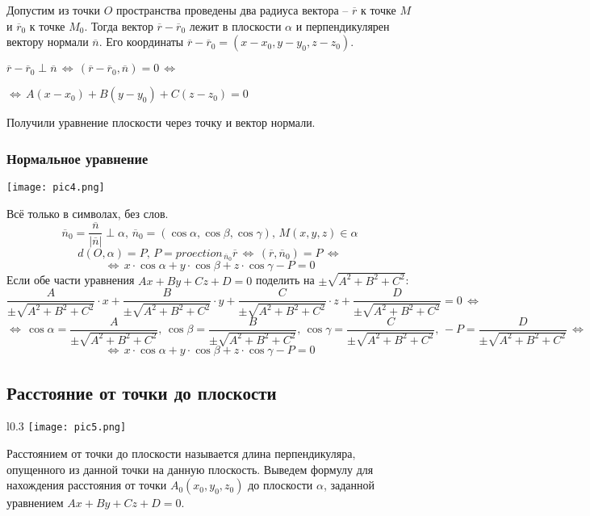 \documentclass{article}
\begin{document}
Допустим из точки $O$ пространства проведены два радиуса вектора -- $\overline{r}$ к точке $M$ и $\overline{r}_0$ к точке $M_0$. Тогда вектор $\overline{r}-\overline{r}_0$ лежит в плоскости $\alpha$ и перпендикулярен вектору нормали $\overline{n}$. Его координаты $\overline{r}-\overline{r}_0=(x-x_0,y-y_0,z-z_0)$.

$\overline{r}-\overline{r}_0\perp \overline{n}\,\Leftrightarrow\,(\overline{r}-\overline{r}_0,\overline{n})=0\,\Leftrightarrow\,$

$\Leftrightarrow\, A(x-x_0)+B(y-y_0)+C(z-z_0)=0 $

Получили уравнение плоскости через точку и вектор нормали.

\newpage
\subsubsection{Нормальное уравнение}
\begin{center}
    \texttt{[image: pic4.png]}
\end{center}
Всё только в символах, без слов.
$$ \overline{n}_0=\frac{\overline{n}}{|\overline{n}|}\perp \alpha,\,\overline{n}_0=(\cos\alpha,\cos\beta,\cos\gamma),\, M(x,y,z)\in\alpha$$
$$d(O,\alpha) = P,\,P=proection_{\,\overline{n}_0}\overline{r}\,\Leftrightarrow\,(\overline{r},\overline{n}_0)=P\,\Leftrightarrow$$
$$ \Leftrightarrow\,x\cdot\cos\alpha+y\cdot\cos\beta+z\cdot\cos\gamma-P=0 $$
Если обе части уравнения $Ax+By+Cz+D=0$ поделить на $\pm\sqrt{A^2+B^2+C^2}$:
$$ \frac{A}{\pm\sqrt{A^2+B^2+C^2}}\cdot x+\frac{B}{\pm\sqrt{A^2+B^2+C^2}}\cdot y+\frac{C}{\pm\sqrt{A^2+B^2+C^2}}\cdot z +\frac{D}{\pm\sqrt{A^2+B^2+C^2}}=0 \,\Leftrightarrow$$
$$ \Leftrightarrow\,\cos\alpha=\frac{A}{\pm\sqrt{A^2+B^2+C^2}},\,\cos\beta=\frac{B}{\pm\sqrt{A^2+B^2+C^2}},\,\cos\gamma=\frac{C}{\pm\sqrt{A^2+B^2+C^2}},\,-P=\frac{D}{\pm\sqrt{A^2+B^2+C^2}}\,\Leftrightarrow $$
$$ \Leftrightarrow\,x\cdot\cos\alpha+y\cdot\cos\beta+z\cdot\cos\gamma-P=0$$
\newpage
\subsection{Расстояние от точки до плоскости}
\begin{wrapfigure}{l}{0.3\textwidth}
    \centering
    \texttt{[image: pic5.png]}
\end{wrapfigure}
Расстоянием от точки до плоскости называется длина перпендикуляра, опущенного из данной точки на данную плоскость. Выведем формулу для нахождения расстояния от точки $A_0(x_0,y_0,z_0)$ до плоскости $\alpha$, заданной уравнением $Ax+By+Cz+D=0$.
\end{document}
